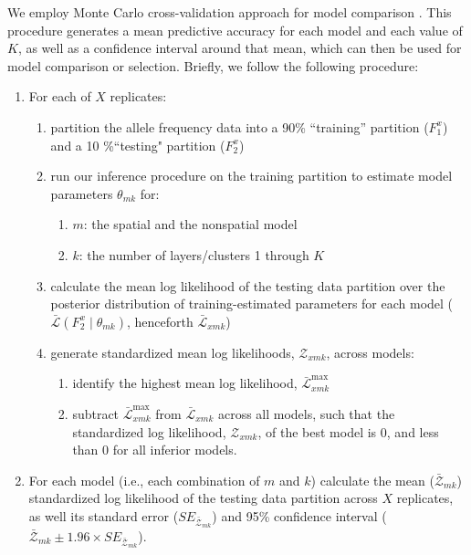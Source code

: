 \documentclass[10pt,letterpaper]{article}
\begin{document}
We employ Monte Carlo cross-validation approach for model comparison \cite{picard1984}. 
This procedure generates a mean predictive accuracy for each model and each value of $K$, 
as well as a confidence interval around that mean,
which can then be used for model comparison or selection.
Briefly, we follow the following procedure:
\begin{enumerate}
\item For each of $X$ replicates:
	\begin{enumerate}
		\item partition the allele frequency data into a 90\% ``training'' partition ($F^x_1$) and a 10 \%``testing" partition ($F^x_2$) \label{partition}
		\item run our inference procedure on the training partition to estimate model parameters $\theta_{mk}$ for: \label{inference}
			\begin{enumerate}
				\item $m$: the spatial and the nonspatial model
				\item $k$: the number of layers/clusters 1 through $K$
			\end{enumerate}	
	\item calculate the mean log likelihood of the testing data partition  
	over the posterior distribution of training-estimated parameters for each model 
	($\bar{\mathcal{L}}(F^x_2 \mid \theta_{mk})$, henceforth $\bar{\mathcal{L}}_{xmk}$) \label{lnL}
	\item generate standardized mean log likelihoods, $\mathcal{Z}_{xmk}$, across models: \label{standardize}
		\begin{enumerate}
			\item identify the highest mean log likelihood, $\bar{\mathcal{L}}^\text{max}_{xmk}$
			\item subtract $\bar{\mathcal{L}}^\text{max}_{xmk}$ from $\bar{\mathcal{L}}_{xmk}$ across all models,
				such that the standardized log likelihood, $\mathcal{Z}_{xmk}$, of the best model is 0,
				and less than 0 for all inferior models. 
		\end{enumerate}
	\end{enumerate}
\item For each model (i.e., each combination of $m$ and $k$) calculate 
	the mean ($	\bar{\mathcal{Z}}_{mk} $) standardized log likelihood of the testing data partition across $X$ replicates, 
	as well its standard error ($SE_{\bar{\mathcal{Z}}_{mk}}$) and
        95\% confidence interval ($\bar{\mathcal{Z}}_{mk} \pm 1.96 \times SE_{\bar{\mathcal{Z}}_{mk}}$).
\end{enumerate}
\end{document}

